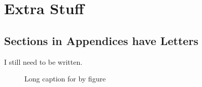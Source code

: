 \chapter{Extra Stuff}
\label{ch:thisChapterLabel}

\section{Sections in Appendices have Letters}

I still need to be written.

\begin{figure}
    \caption[Caption for list of figures.]{Long caption for by figure}
    \label{fig:thisFigLabel}
\end{figure}
